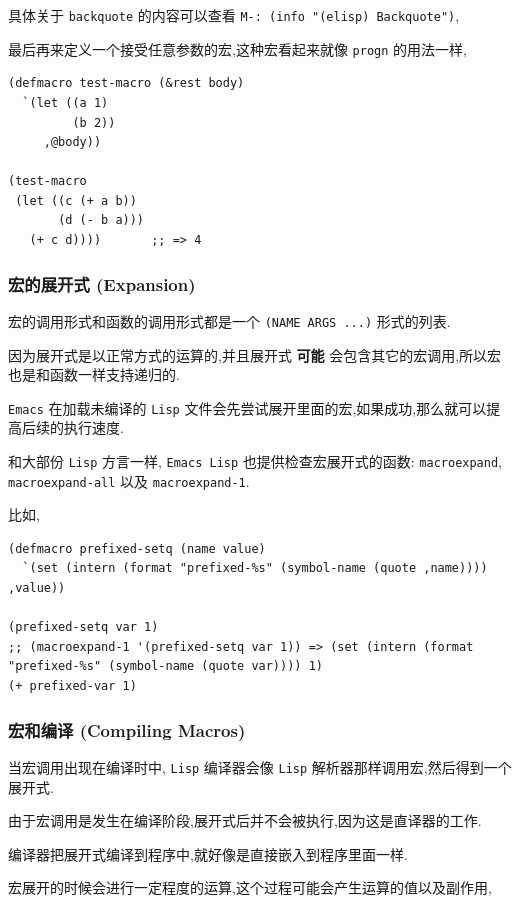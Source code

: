 \documentclass[11pt]{article}
\begin{document}
具体关于 \texttt{backquote} 的内容可以查看 \texttt{M-: (info "(elisp) Backquote")},

最后再来定义一个接受任意参数的宏,这种宏看起来就像 \texttt{progn} 的用法一样,

\begin{verbatim}
(defmacro test-macro (&rest body)
  `(let ((a 1)
         (b 2))
     ,@body))

(test-macro
 (let ((c (+ a b))
       (d (- b a)))
   (+ c d))))       ;; => 4
\end{verbatim}

\subsubsection{宏的展开式 (Expansion)}
\label{sec:org2d0da3d}

宏的调用形式和函数的调用形式都是一个 \texttt{(NAME ARGS ...)} 形式的列表.

因为展开式是以正常方式的运算的,并且展开式 \textbf{可能} 会包含其它的宏调用,所以宏也是和函数一样支持递归的.

\texttt{Emacs} 在加载未编译的 \texttt{Lisp} 文件会先尝试展开里面的宏,如果成功,那么就可以提高后续的执行速度.

和大部份 \texttt{Lisp} 方言一样, \texttt{Emacs Lisp} 也提供检查宏展开式的函数: \texttt{macroexpand}, \texttt{macroexpand-all} 以及 \texttt{macroexpand-1}.

比如,

\begin{verbatim}
(defmacro prefixed-setq (name value)
  `(set (intern (format "prefixed-%s" (symbol-name (quote ,name)))) ,value))

(prefixed-setq var 1)
;; (macroexpand-1 '(prefixed-setq var 1)) => (set (intern (format "prefixed-%s" (symbol-name (quote var)))) 1)
(+ prefixed-var 1)
\end{verbatim}


\subsubsection{宏和编译 (Compiling Macros)}
\label{sec:orgf8d1361}

当宏调用出现在编译时中, \texttt{Lisp} 编译器会像 \texttt{Lisp} 解析器那样调用宏,然后得到一个展开式.

由于宏调用是发生在编译阶段,展开式后并不会被执行,因为这是直译器的工作.

编译器把展开式编译到程序中,就好像是直接嵌入到程序里面一样.

宏展开的时候会进行一定程度的运算,这个过程可能会产生运算的值以及副作用,
\end{document}
